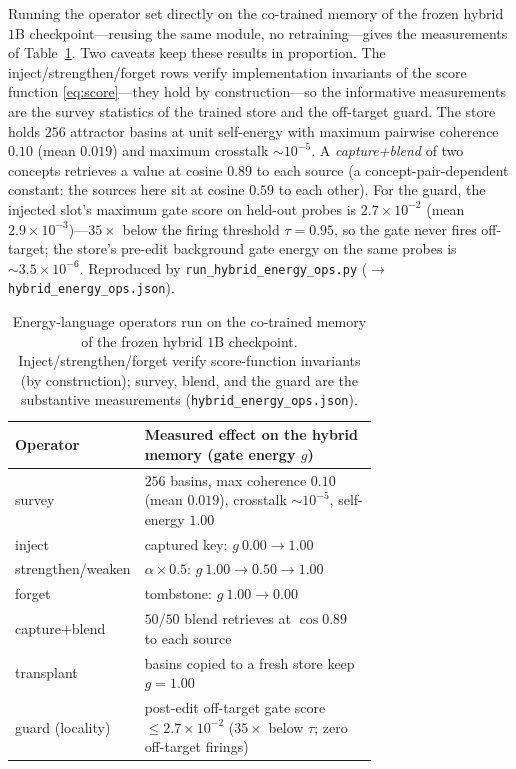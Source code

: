 \documentclass[10pt,twocolumn]{article}
\theoremstyle{remark}
\begin{document}
Running the operator set directly on the co-trained memory of the frozen hybrid
$1$B checkpoint---reusing the same module, no retraining---gives the measurements
of Table~\ref{tab:energyops}. Two caveats keep these results in proportion. The
inject/strengthen/forget rows verify implementation invariants of the score
function \eqref{eq:score}---they hold by construction---so the informative
measurements are the survey statistics of the trained store and the off-target
guard. The store holds $256$ attractor basins at unit self-energy with maximum
pairwise coherence $0.10$ (mean $0.019$) and maximum crosstalk
$\sim\!10^{-5}$. A \emph{capture+blend} of two concepts retrieves a value at
cosine $0.89$ to each source (a concept-pair-dependent constant: the sources
here sit at cosine $0.59$ to each other). For the guard, the injected slot's
maximum gate score on held-out probes is $2.7\times10^{-2}$ (mean
$2.9\times10^{-3}$)---$35\times$ below the firing threshold $\tau=0.95$, so the
gate never fires off-target; the store's pre-edit background gate energy on the
same probes is $\sim\!3.5\times10^{-6}$. Reproduced by
\texttt{run\_hybrid\_energy\_ops.py} ($\to$\,\texttt{hybrid\_energy\_ops.json}).

\begin{table}[t]
\centering\small
\begin{tabular}{@{}l >{\raggedright\arraybackslash}p{0.72\linewidth}@{}}
\toprule
Operator & Measured effect on the hybrid memory (gate energy $g$) \\
\midrule
survey & $256$ basins, max coherence $0.10$ (mean $0.019$), crosstalk $\sim\!10^{-5}$, self-energy $1.00$ \\
inject & captured key: $g\ 0.00\!\to\!1.00$ \\
strengthen/weaken & $\alpha\!\times\!0.5$: $g\ 1.00\!\to\!0.50\!\to\!1.00$ \\
forget & tombstone: $g\ 1.00\!\to\!0.00$ \\
capture+blend & $50/50$ blend retrieves at $\cos 0.89$ to each source \\
transplant & basins copied to a fresh store keep $g=1.00$ \\
guard (locality) & post-edit off-target gate score $\le 2.7\times10^{-2}$ ($35\times$ below $\tau$; zero off-target firings) \\
\bottomrule
\end{tabular}
\caption{Energy-language operators run on the co-trained memory of the frozen
hybrid $1$B checkpoint. Inject/strengthen/forget verify score-function invariants
(by construction); survey, blend, and the guard are the substantive measurements
(\texttt{hybrid\_energy\_ops.json}).}
\label{tab:energyops}
\end{table}
\end{document}

